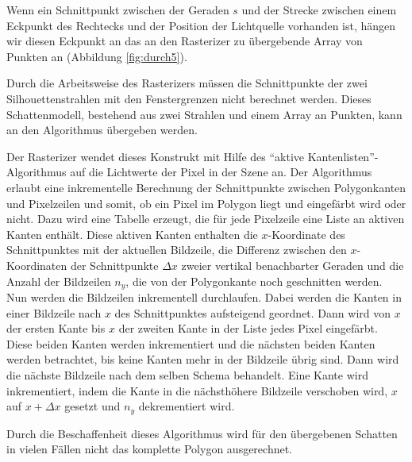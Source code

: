 Wenn ein Schnittpunkt zwischen der Geraden $s$ und der Strecke zwischen einem Eckpunkt des Rechtecks
und der Position der Lichtquelle vorhanden ist, hängen wir diesen Eckpunkt an das an den Rasterizer
zu übergebende Array von Punkten an (Abbildung \ref{fig:durch5}).

Durch die Arbeitsweise des Rasterizers müssen die Schnittpunkte der zwei Silhouettenstrahlen mit den
Fenstergrenzen nicht berechnet werden. Dieses Schattenmodell, bestehend aus zwei Strahlen und einem
Array an Punkten, kann an den Algorithmus übergeben werden.

Der Rasterizer wendet dieses Konstrukt mit Hilfe des "`aktive Kantenlisten"'-Algorithmus auf die
Lichtwerte der Pixel in der Szene an. Der Algorithmus erlaubt eine inkrementelle
Berechnung der Schnittpunkte zwischen Polygonkanten und Pixelzeilen und somit, ob ein Pixel
im Polygon liegt und eingefärbt wird oder nicht. Dazu wird eine Tabelle erzeugt, die für jede Pixelzeile eine Liste an aktiven Kanten
enthält. Diese aktiven Kanten enthalten die $x$-Koordinate des Schnittpunktes mit der aktuellen Bildzeile, die
Differenz zwischen den $x$-Koordinaten der Schnittpunkte $\Delta x$ zweier vertikal benachbarter
Geraden und die Anzahl der Bildzeilen $n_y$, die von der Polygonkante noch geschnitten werden. Nun
werden die Bildzeilen inkrementell durchlaufen. Dabei werden die Kanten in einer Bildzeile nach $x$
des Schnittpunktes aufsteigend geordnet. Dann wird von $x$ der ersten Kante bis $x$ der zweiten Kante in der Liste
jedes Pixel eingefärbt. Diese beiden Kanten werden inkrementiert und die nächsten beiden Kanten werden
betrachtet, bis keine Kanten mehr in der Bildzeile übrig sind. Dann wird die nächste Bildzeile
nach dem selben Schema behandelt. Eine Kante wird inkrementiert, indem die Kante in die nächsthöhere Bildzeile verschoben
wird, $x$ auf $x + \Delta x$ gesetzt und $n_y$ dekrementiert wird.


Durch die Beschaffenheit dieses Algorithmus wird für den übergebenen Schatten in vielen Fällen nicht das komplette
Polygon ausgerechnet.
